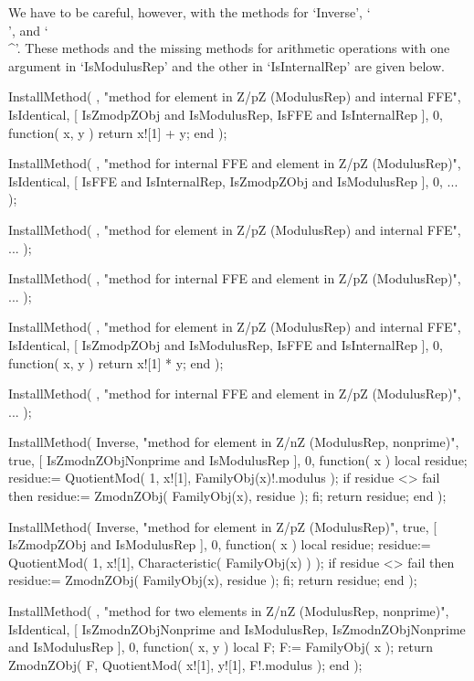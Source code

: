 We have to be careful, however, with the methods for `Inverse', `\\\/',
and `\\^'.
These methods and the missing methods for arithmetic operations with
one argument in `IsModulusRep' and the other in `IsInternalRep'
are given below.

\beginexample
    InstallMethod( \+,
        "method for element in Z/pZ (ModulusRep) and internal FFE",
        IsIdentical,
        [ IsZmodpZObj and IsModulusRep, IsFFE and IsInternalRep ], 0,
        function( x, y ) return x![1] + y; end );

    InstallMethod( \+,
        "method for internal FFE and element in Z/pZ (ModulusRep)",
        IsIdentical,
        [ IsFFE and IsInternalRep, IsZmodpZObj and IsModulusRep ], 0,
        ... );

    InstallMethod( \-,
        "method for element in Z/pZ (ModulusRep) and internal FFE",
        ... );

    InstallMethod( \-,
        "method for internal FFE and element in Z/pZ (ModulusRep)",
        ... );

    InstallMethod( \*,
        "method for element in Z/pZ (ModulusRep) and internal FFE",
        IsIdentical,
        [ IsZmodpZObj and IsModulusRep, IsFFE and IsInternalRep ], 0,
        function( x, y ) return x![1] * y; end );

    InstallMethod( \*,
        "method for internal FFE and element in Z/pZ (ModulusRep)",
        ... );

    InstallMethod( Inverse,
        "method for element in Z/nZ (ModulusRep, nonprime)",
        true,
        [ IsZmodnZObjNonprime and IsModulusRep ], 0,
        function( x )
        local residue;
        residue:= QuotientMod( 1, x![1], FamilyObj(x)!.modulus );
        if residue <> fail then
          residue:= ZmodnZObj( FamilyObj(x), residue );
        fi;
        return residue;
        end );

    InstallMethod( Inverse,
        "method for element in Z/pZ (ModulusRep)",
        true,
        [ IsZmodpZObj and IsModulusRep ], 0,
        function( x )
        local residue;
        residue:= QuotientMod( 1, x![1], Characteristic( FamilyObj(x) ) );
        if residue <> fail then
          residue:= ZmodnZObj( FamilyObj(x), residue );
        fi;
        return residue;
        end );

    InstallMethod( \/,
        "method for two elements in Z/nZ (ModulusRep, nonprime)",
        IsIdentical,
        [ IsZmodnZObjNonprime and IsModulusRep,
          IsZmodnZObjNonprime and IsModulusRep ], 0,
        function( x, y )
        local F;
        F:= FamilyObj( x );
        return ZmodnZObj( F, QuotientMod( x![1], y![1], F!.modulus );
        end );

